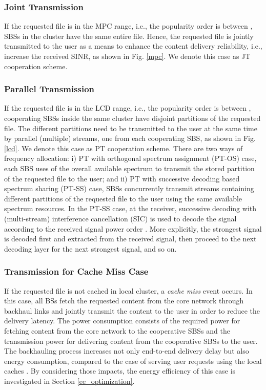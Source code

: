 \documentclass[twocolumns,10pt]{IEEEtran}
\begin{document}
\subsubsection{Joint Transmission}
If the requested file  is in the MPC range, i.e., the popularity order is between ,  SBSs in the cluster have the same entire file. Hence, the requested file is jointly transmitted to the user as a means to enhance the content delivery reliability, i.e., increase the received SINR, as shown in Fig. \ref{mpc}. We denote this case as JT cooperation scheme. 

\subsubsection{Parallel Transmission}
If the requested file  is in the LCD range, i.e., the popularity order is between , cooperating SBSs inside the same cluster have disjoint partitions of the requested file. The different partitions need to be transmitted to the user at the same time by parallel (multiple) streams, one from each cooperating SBS, as shown in Fig. \ref{lcd}. We denote this case as PT cooperation scheme.
There are two ways of frequency allocation: i) PT with orthogonal spectrum assignment (PT-OS) case, each SBS uses  of the overall available spectrum to transmit the stored partition of the requested file to the user; and ii) PT with successive decoding based spectrum sharing (PT-SS) case, 
 SBSs concurrently transmit  streams containing different partitions of the requested file to the user using the same available spectrum resources. 
In the PT-SS case, at the receiver, successive decoding with (multi-stream) interference cancellation (SIC) is used to decode the signal according to the received signal power order \cite{SIC, zhang2014}. More explicitly, the strongest signal is decoded first and extracted from the received signal, then proceed to the next decoding layer for the next strongest signal, and so on.

\subsubsection{Transmission for Cache Miss Case}
If the requested file is not cached in local cluster, a {\emph{cache miss}} event occurs. In this case, all BSs fetch the requested content from the core network through backhaul links and jointly transmit the content to the user in order to reduce the delivery latency. The power consumption consists of the required power for fetching content from the core network to the cooperative SBSs and the transmission power for delivering content from the cooperative SBSs to the user. 
The backhauling process increases not only end-to-end delivery delay but also energy consumption, compared to the case of serving user requests using the local caches \cite{backhaul_2, ee_hetnets}. By considering those impacts, the energy efficiency of this case is investigated in Section \ref{ee_optimization}.
\end{document}
